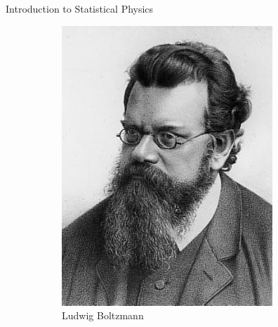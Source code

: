 \documentclass{beamer}
\begin{document}
\begin{frame}{Introduction to Statistical Physics}
  \begin{figure}[h!]
    \centering
    \begin{subfigure}[b]{0.25\linewidth}
      \includegraphics[width=\linewidth]{figures/boltzmann.jpeg}
      \caption{Ludwig Boltzmann~\cite{boltzmann}}
    \end{subfigure}%
    \quad
    \begin{subfigure}[b]{0.25\linewidth}

\end{subfigure}
\end{figure}
\end{frame}
\end{document}
